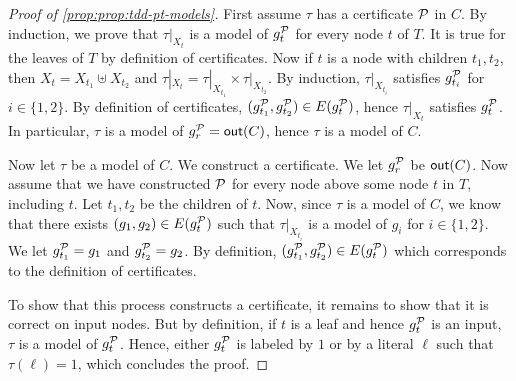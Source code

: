 \documentclass[a4paper,UKenglish,cleveref, autoref, thm-restate]{lipics-v2021}
\begin{document}
\begin{toappendix}
\begin{proof}[Proof of \cref{prop:prop:tdd-pt-models}]
  First assume $\tau$ has a certificate $\mathcal{P}$ in $C$. By induction, we prove that $\tau|_{X_t}$ is a model of $g_t^{\mathcal{P}}$ for every node $t$ of $T$. It is true for the leaves of $T$ by definition of certificates. Now if $t$ is a node with children $t_1,t_2$, then $X_t = X_{t_1} \uplus X_{t_2}$ and $\tau|_{X_t} = \tau|_{X_{t_1}} \times \tau|_{X_{t_2}}$. By induction, $\tau|_{X_{t_i}}$ satisfies $g_{t_i}^{\mathcal{P}}$ for $i \in \{1,2\}$. By definition of certificates, $(g_{t_1}^{\mathcal{P}}, g_{t_2}^{\mathcal{P}}) \in E(g^{\mathcal{P}}_{t})$, hence $\tau|_{X_t}$ satisfies $g_t^{\mathcal{P}}$.
%
  In particular, $\tau$ is a model of $g_r^\calP = \out$, hence $\tau$ is a model of $C$.

  Now let $\tau$ be a model of $C$. We construct a certificate. We let $g_r^{\mathcal{P}}$ be $\out$. Now assume that we have constructed $\mathcal{P}$ for every node above some node $t$ in $T$, including $t$. Let $t_1,t_2$ be the children of $t$. Now, since $\tau$ is a model of $C$, we know that there exists $(g_1,g_2) \in E(g_t^{\mathcal{P}})$ such that $\tau|_{X_{t_i}}$ is a model of $g_i$ for $i \in \{1,2\}$. We let $g_{t_1}^{\mathcal{P}} = g_1$ and $g_{t_2}^{\mathcal{P}} = g_2$. By definition, $(g_{t_1}^{\mathcal{P}}, g_{t_2}^{\mathcal{P}}) \in E(g_t^{\mathcal{P}})$ which corresponds to the definition of certificates.

  To show that this process constructs a certificate, it remains to show that it is correct on input nodes. But by definition, if $t$ is a leaf and hence $g_t^{\mathcal{P}}$ is an input, $\tau$ is a model of $g_t^{\mathcal{P}}$. Hence, either $g_t^{\mathcal{P}}$ is labeled by $1$ or by a literal $\ell$ such that $\tau(\ell)=1$, which concludes the proof.
\end{proof}
\end{toappendix}
\end{document}
